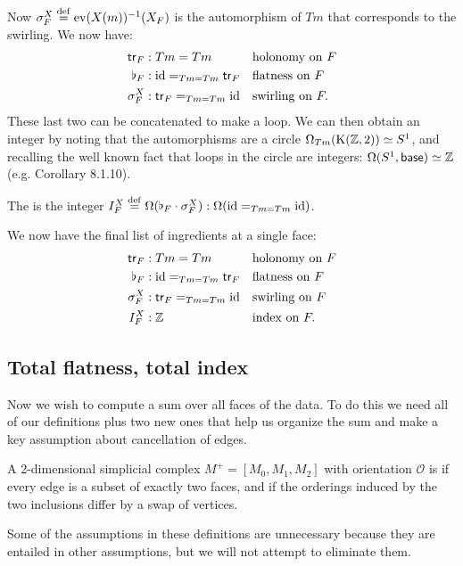 Now \( \sigma^X_F\stackrel{\mathrm{def}}{=}\mathrm{ev}(X(m))^{-1}(X_F) \) is the automorphism of \( Tm \) that corresponds to the swirling. We now have:
\[\begin{aligned}
\mathsf{tr}_F&:Tm=Tm&&\text{holonomy on }F\\
\flat_F&:\text{id}=_{Tm=Tm}\mathsf{tr}_F&&\text{flatness on }F\\
\sigma^X_F&:\mathsf{tr}_F=_{Tm=Tm}\text{id}&&\text{swirling on }F.\\
\end{aligned}\]
These last two can be concatenated to make a loop. We can then obtain an integer by noting that the automorphisms are a circle \( \Omega_{Tm}(\mathrm{K}(\mathbb{Z},2))\simeq S^1 \), and recalling the well known fact that loops in the circle are integers: \( \Omega(S^1,\mathsf{base})\simeq\mathbb{Z} \) (e.g. \cite{hottbook} Corollary 8.1.10).
\begin{mydef}
\label{def:index}
The  is the integer \( I^X_F\stackrel{\mathrm{def}}{=}\Omega(\flat_F\cdot \sigma^X_F):\Omega(\text{id}=_{Tm=Tm}\text{id}) \).
\end{mydef}
We now have the final list of ingredients at a single face:
\begin{equation}
\label{eq:face_elements}
\begin{aligned}
\mathsf{tr}_F&:Tm=Tm&&\text{holonomy on }F\\
\flat_F&:\text{id}=_{Tm=Tm}\mathsf{tr}_F&&\text{flatness on }F\\
\sigma^X_F&:\mathsf{tr}_F=_{Tm=Tm}\text{id}&&\text{swirling on }F\\
I^X_F&:\mathbb{Z}&&\text{index on }F.
\end{aligned}
\end{equation}

\subsection{Total flatness, total index}
Now we wish to compute a sum over all faces of the data. To do this we need all of our definitions plus two new ones that help us organize the sum and make a key assumption about cancellation of edges.

\begin{mydef}
A 2-dimensional simplicial complex \( M^+=[M_0, M_1, M_2] \) with orientation \( \mathscr{O} \) is  if every edge is a subset of exactly two faces, and if the orderings induced by the two inclusions differ by a swap of vertices.
\end{mydef}

Some of the assumptions in these definitions are unnecessary because they are entailed in other assumptions, but we will not attempt to eliminate them.

